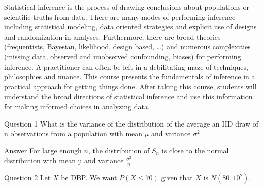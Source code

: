Statistical inference is the process of drawing conclusions about populations or scientific truths from data. There are many modes of performing inference including statistical modeling, data oriented strategies and explicit use of designs and randomization in analyses. Furthermore, there are broad theories (frequentists, Bayesian, likelihood, design based, …) and numerous complexities (missing data, observed and unobserved confounding, biases) for performing inference. A practitioner can often be left in a debilitating maze of techniques, philosophies and nuance. This course presents the fundamentals of inference in a practical approach for getting things done. After taking this course, students will understand the broad directions of statistical inference and use this information 
for making informed choices in analyzing data.

Question 1
What is the variance of the distribution of the average an IID draw of n observations from a population with mean \(μ\) and variance \(σ^2\).

Answer
For large enough \(n\), the distribution of \(S_n\) is close to the normal distribution with mean \(µ\) and variance \(\frac{σ^2}{n}\)


Question 2
Let \(X\) be DBP. We want \(P(X \leq 70)\) given that \(X\) is \(N(80, 10^2)\).


